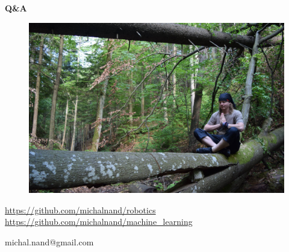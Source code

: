 \documentclass[xcolor=dvipsnames]{beamer}
\begin{document}
\begin{frame}{\bf Q\&A}

\begin{figure}[ht]
\begin{center}
\begin{minipage}{0.8\linewidth}
\begin{center}
 \includegraphics[width=1.0\textwidth]{../../pictures/me.jpg}
\end{center}
\end{minipage}
\end{center}
\end{figure}

\url{https://github.com/michalnand/robotics}
\url{https://github.com/michalnand/machine\_learning}

\centerline{michal.nand@gmail.com}

\end{frame}
\end{document}
